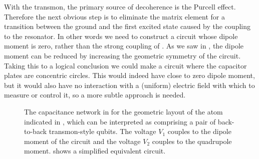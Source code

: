 With the transmon, the primary source of decoherence is the Purcell effect. Therefore the next obvious step is to eliminate the matrix element for a transition between the ground and the first excited state caused by the coupling to the resonator. In other words we need to construct a circuit whose dipole moment is zero, rather than the strong coupling of . As we saw in , the dipole moment can be reduced by increasing the geometric symmetry of the circuit. Taking this to a logical conclusion we could make a circuit where the capacitor plates are concentric circles. This would indeed have close to zero dipole moment, but it would also have no interaction with a (uniform) electric field with which to measure or control it, so a more subtle approach is needed.
\begin{figure}
\centering
{}
\caption[An artificial atom with a quadrupole transition]{\label{fig:fullcrct} The capacitance network  in  for the geometric layout of the atom indicated in , which can be interpreted as comprising a pair of back-to-back transmon-style qubits. The voltage $V_1$ couples to the dipole moment of the circuit and the voltage $V_2$ couples to the quadrupole moment.  shows a simplified equivalent circuit.}
\end{figure}

